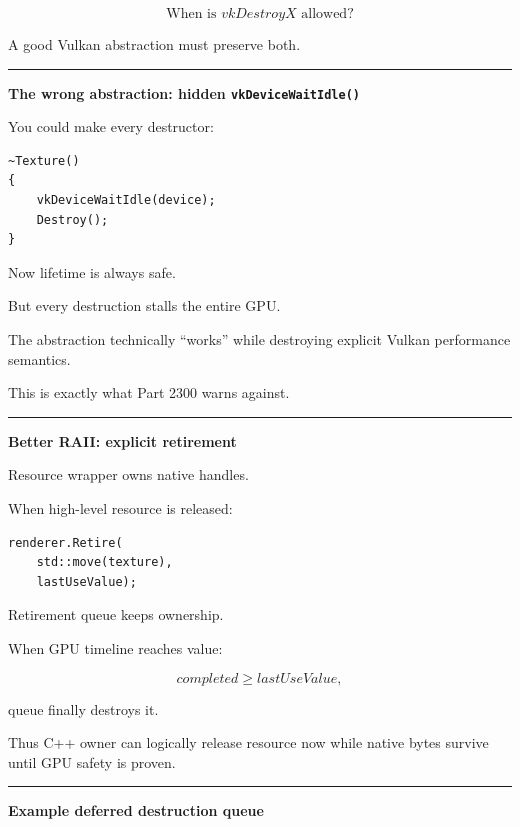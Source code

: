 \[
\boxed{
\text{When is }vkDestroyX\text{ allowed?}
}
\]

A good Vulkan abstraction must preserve both.

\begin{center}\rule{0.5\linewidth}{0.5pt}\end{center}

\textbf{The wrong abstraction: hidden \texttt{vkDeviceWaitIdle()}}

You could make every destructor:

\begin{verbatim}
~Texture()
{
    vkDeviceWaitIdle(device);
    Destroy();
}
\end{verbatim}

Now lifetime is always safe.

But every destruction stalls the entire GPU.

The abstraction technically ``works'' while destroying explicit Vulkan performance semantics.

This is exactly what Part 2300 warns against.

\begin{center}\rule{0.5\linewidth}{0.5pt}\end{center}

\textbf{Better RAII: explicit retirement}

Resource wrapper owns native handles.

When high-level resource is released:

\begin{verbatim}
renderer.Retire(
    std::move(texture),
    lastUseValue);
\end{verbatim}

Retirement queue keeps ownership.

When GPU timeline reaches value:

\[
completed\ge lastUseValue,
\]

queue finally destroys it.

Thus C++ owner can logically release resource now while native bytes survive until GPU safety is proven.

\begin{center}\rule{0.5\linewidth}{0.5pt}\end{center}

\textbf{Example deferred destruction queue}

